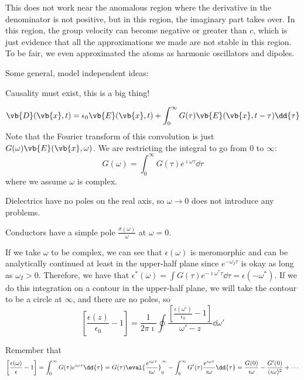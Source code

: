 \documentclass[a4paper,twoside,master.tex]{subfiles}
\begin{document}
This does not work near the anomalous region where the derivative in the denominator is not positive, but in this region, the imaginary part takes over. In this region, the group velocity can become negative or greater than $ c $, which is just evidence that all the approximations we made are not stable in this region. To be fair, we even approximated the atoms as harmonic oscillators and dipoles.

Some general, model independent ideas:

Causality must exist, this is a big thing!

\begin{equation}
    \vb{D}(\vb{x}, t) = \epsilon_0 \vb{E}(\vb{x}, t) + \int_0^{\infty} G(\tau) \vb{E}(\vb{x}, t-\tau) \dd{\tau}
\end{equation}
Note that the Fourier transform of this convolution is just $ G(\omega) \vb{E}(\vb{x}, \omega) $. We are restricting the integral to go from $ 0 $ to $ \infty $:
\begin{equation}
    G(\omega) = \int_0^{\infty} G(\tau) e^{\imath \omega \tau} \dd{\tau}
\end{equation}
where we assume $ \omega $ is complex.

Dielectrics have no poles on the real axis, so $ \omega \to 0 $ does not introduce any problems.

Conductors have a simple pole $ \frac{\sigma(\omega)}{\omega} $ at $ \omega = 0 $.

If we take $\omega$ to be complex, we can see that $\epsilon(\omega) $ is meromorphic and can be analytically continued at least in the upper-half plane since $ e^{- \omega_I \tau} $ is okay as long as $ \omega_I > 0 $. Therefore, we have that $ \epsilon^*(\omega) = \int G(\tau) e^{- \imath \omega^* \tau} \dd{\tau} = \epsilon(- \omega^*) $. If we do this integration on a contour in the upper-half plane, we will take the contour to be a circle at $ \infty $, and there are no poles, so
\begin{equation}
    \left[ \frac{\epsilon(z)}{\epsilon_0} - 1 \right] = \frac{1}{2 \pi \imath} \oint \frac{\left[ \frac{\epsilon(\omega')}{\epsilon_0} - 1 \right]}{\omega' - z} \dd{\omega'}
\end{equation}

Remember that
\begin{equation}
    \left[ \frac{\epsilon(\omega)}{\epsilon} - 1 \right] = \int_0^{\infty} G(\tau) e^{\imath \omega \tau} \dd{\tau} = G(\tau) \eval{\frac{e^{\imath \omega \tau}}{\imath \omega}}_{0}^{\infty} - \int_0^{\infty} G'(\tau) \frac{e^{\imath \omega \tau}}{\imath \omega} \dd{\tau} = \frac{G(0)}{\imath \omega} - \frac{G'(0)}{(\imath \omega)^2} + \cdots
\end{equation}
\end{document}
